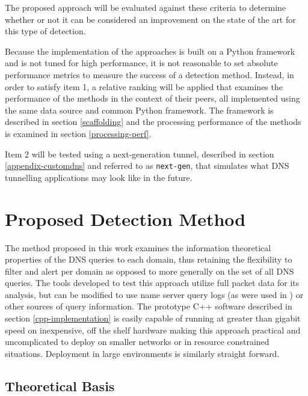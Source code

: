 \documentclass[12pt]{report}
\theoremstyle{remark}
\theoremstyle{definition}
\theoremstyle{definition}
\theoremstyle{definition}
\begin{document}
The proposed approach will be evaluated against these criteria to determine
whether or not it can be considered an improvement on the state of the art for
this type of detection. 


Because the implementation of the approaches is built on a Python framework and
is not tuned for high performance, it is not reasonable to set absolute
performance metrics to measure the success of a detection method. Instead, in order to satisfy item 1, a
relative ranking will be applied that examines the performance of the methods
in the context of their peers, all implemented using the same data source and
common Python framework. The framework is described in section \ref{scaffolding}
and the processing performance of the methods is examined in section
\ref{processing-perf}.

Item 2 will be tested using a next-generation tunnel, described in section
\ref{appendix-customdns} and referred to as \texttt{next-gen}, that simulates
what DNS tunnelling applications may look like in the future.

\chapter{Proposed Detection Method}
\label{proposed-method}

The method proposed in this work examines the information theoretical properties
of the DNS queries to each domain, thus retaining the flexibility to filter
and alert per domain as opposed to more generally on the set of all DNS queries.
The tools developed to test this approach utilize full packet data for its
analysis, but can be modified to use name server query logs (as were used in
\cite{Romana2007}) or other sources of query information. The prototype C++ software described in section \ref{cpp-implementation}
is easily capable of running at greater than gigabit speed on inexpensive, off
the shelf hardware making this approach practical and uncomplicated to deploy on
smaller networks or in resource constrained situations. Deployment in large
environments is similarly straight forward.

\section{Theoretical Basis}
\end{document}
